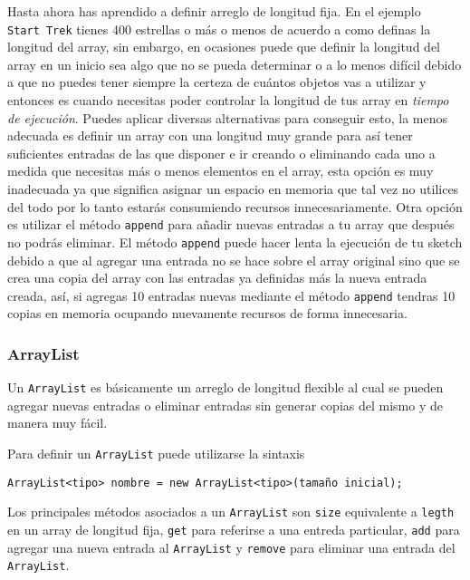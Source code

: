 \documentclass[11pt]{article}
\begin{document}
Hasta ahora has aprendido a definir arreglo de longitud fija. En el
ejemplo \texttt{Start\ Trek} tienes 400 estrellas o más o menos de
acuerdo a como definas la longitud del array, sin embargo, en ocasiones
puede que definir la longitud del array en un inicio sea algo que no se
pueda determinar o a lo menos difícil debido a que no puedes tener
siempre la certeza de cuántos objetos vas a utilizar y entonces es
cuando necesitas poder controlar la longitud de tus array en
\emph{tiempo de ejecución}. Puedes aplicar diversas alternativas para
conseguir esto, la menos adecuada es definir un array con una longitud
muy grande para así tener suficientes entradas de las que disponer e ir
creando o eliminando cada uno a medida que necesitas más o menos
elementos en el array, esta opción es muy inadecuada ya que significa
asignar un espacio en memoria que tal vez no utilices del todo por lo
tanto estarás consumiendo recursos innecesariamente. Otra opción es
utilizar el método \texttt{append} para añadir nuevas entradas a tu
array que después no podrás eliminar. El método \texttt{append} puede
hacer lenta la ejecución de tu sketch debido a que al agregar una
entrada no se hace sobre el array original sino que se crea una copia
del array con las entradas ya definidas más la nueva entrada creada,
así, si agregas 10 entradas nuevas mediante el método \texttt{append}
tendras 10 copias en memoria ocupando nuevamente recursos de forma
innecesaria.

\hypertarget{arraylist}{%
\subsubsection{ArrayList}\label{arraylist}}

Un \texttt{ArrayList} es básicamente un arreglo de longitud flexible al
cual se pueden agregar nuevas entradas o eliminar entradas sin generar
copias del mismo y de manera muy fácil.

Para definir un \texttt{ArrayList} puede utilizarse la sintaxis

\begin{verbatim}
ArrayList<tipo> nombre = new ArrayList<tipo>(tamaño inicial);
\end{verbatim}

Los principales métodos asociados a un \texttt{ArrayList} son
\texttt{size} equivalente a \texttt{legth} en un array de longitud fija,
\texttt{get} para referirse a una entreda particular, \texttt{add} para
agregar una nueva entrada al \texttt{ArrayList} y \texttt{remove} para
eliminar una entrada del \texttt{ArrayList}.
\end{document}
